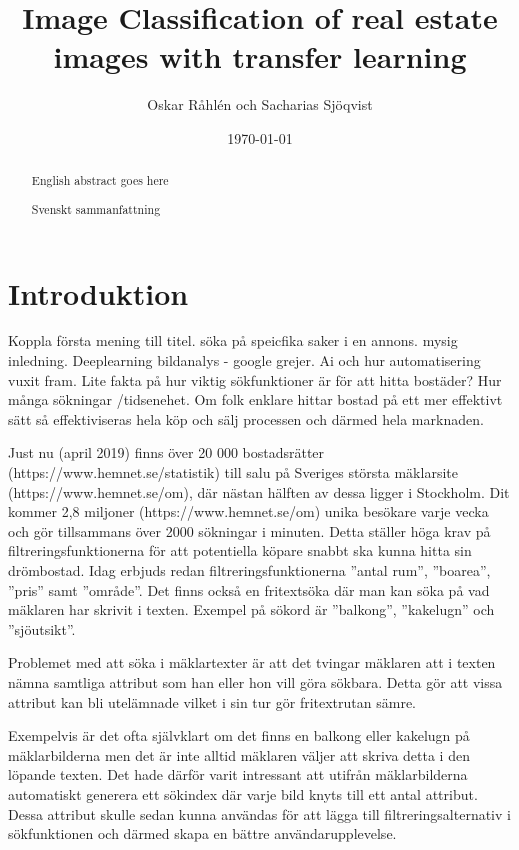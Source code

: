 \documentclass[]{kththesis}
\title{Image Classification of real estate images with transfer learning}
\author{Oskar Råhlén och Sacharias Sjöqvist}
\date{\today}
\begin{document}
\frontmatter
\titlepage

\begin{abstract}
    English abstract goes here
\end{abstract}

\begin{otherlanguage}{swedish}
  \begin{abstract}
    Svenskt sammanfattning
  \end{abstract}
\end{otherlanguage}
  
\tableofcontents

\mainmatter

\chapter{Introduktion}
Koppla första mening till titel. söka på speicfika saker i en annons. mysig inledning. Deeplearning bildanalys - google grejer. Ai och hur automatisering vuxit fram. Lite fakta på hur viktig sökfunktioner är för att hitta bostäder? Hur många sökningar /tidsenehet. Om folk enklare hittar bostad på ett mer effektivt sätt så effektiviseras hela köp och sälj processen och därmed hela marknaden.

Just nu (april 2019) finns över 20 000 bostadsrätter (https://www.hemnet.se/statistik) till salu på Sveriges största mäklarsite (https://www.hemnet.se/om), där nästan hälften av dessa ligger i Stockholm. 
Dit kommer 2,8 miljoner (https://www.hemnet.se/om) unika besökare varje vecka och gör tillsammans över 2000 sökningar i minuten.
Detta ställer höga krav på filtreringsfunktionerna för att potentiella köpare snabbt ska kunna hitta sin drömbostad.
Idag erbjuds redan filtreringsfunktionerna ”antal rum”, ”boarea”, ”pris” samt ”område”. 
Det finns också en fritextsöka där man kan söka på vad mäklaren har skrivit i texten.
Exempel på sökord är ”balkong”, ”kakelugn” och ”sjöutsikt”. 

Problemet med att söka i mäklartexter är att det tvingar mäklaren att i texten nämna samtliga attribut som han eller hon vill göra sökbara. 
Detta gör att vissa attribut kan bli utelämnade vilket i sin tur gör fritextrutan sämre.

Exempelvis är det ofta självklart om det finns en balkong eller kakelugn på mäklarbilderna men det är inte alltid mäklaren väljer att skriva detta i den löpande texten.
Det hade därför varit intressant att utifrån mäklarbilderna automatiskt generera ett sökindex där varje bild knyts till ett antal attribut.
Dessa attribut skulle sedan kunna användas för att lägga till filtreringsalternativ i sökfunktionen och därmed skapa en bättre användarupplevelse.
\end{document}
